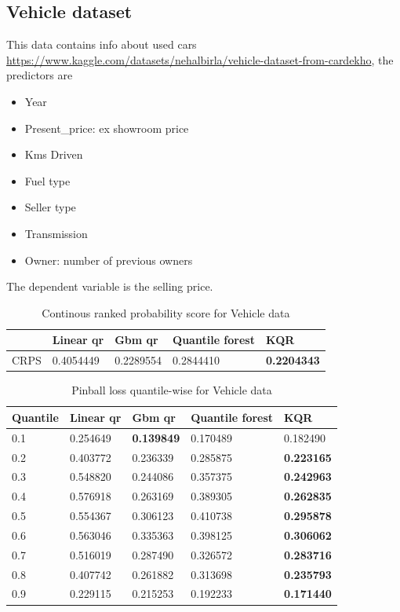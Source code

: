 \subsection{Vehicle dataset}
This data contains info about used cars \url{https://www.kaggle.com/datasets/nehalbirla/vehicle-dataset-from-cardekho}, the predictors are
\begin{itemize}
    \item Year
    \item Present\_price: ex showroom price
    \item Kms Driven
    \item Fuel type
    \item Seller type
    \item Transmission
    \item Owner: number of previous owners
\end{itemize}
The dependent variable is the selling price.

\begin{table}
\caption{Continous ranked probability score for Vehicle data}
\begin{tabular}{lllll}
    \toprule
     & Linear qr & Gbm qr & Quantile forest & KQR \\
    \midrule
    CRPS & 0.4054449 & 0.2289554 & 0.2844410 & \textbf{0.2204343} \\
    \bottomrule
    \end{tabular}
\end{table}

\begin{table}
    \caption{Pinball loss quantile-wise for Vehicle data}
    \begin{tabular}{lllll}
    \toprule
    Quantile & Linear qr & Gbm qr & Quantile forest & KQR \\
    \midrule
    0.1 & 0.254649 & \textbf{0.139849} & 0.170489 & 0.182490 \\
    0.2 & 0.403772 & 0.236339 & 0.285875 & \textbf{0.223165} \\
    0.3 & 0.548820 & 0.244086 & 0.357375 & \textbf{0.242963} \\
    0.4 & 0.576918 & 0.263169 & 0.389305 & \textbf{0.262835} \\
    0.5 & 0.554367 & 0.306123 & 0.410738 & \textbf{0.295878} \\
    0.6 & 0.563046 & 0.335363 & 0.398125 & \textbf{0.306062} \\
    0.7 & 0.516019 & 0.287490 & 0.326572 & \textbf{0.283716} \\
    0.8 & 0.407742 & 0.261882 & 0.313698 & \textbf{0.235793} \\
    0.9 & 0.229115 & 0.215253 & 0.192233 & \textbf{0.171440} \\
    \bottomrule
    \end{tabular}
\end{table}

